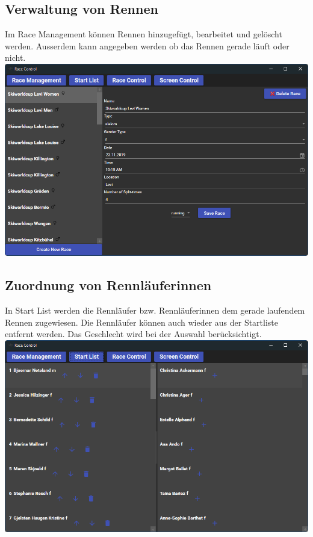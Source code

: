 \documentclass[a4paper, 12pt]{article}
\begin{document}
	\subsection{Verwaltung von Rennen}
	Im Race Management können Rennen hinzugefügt, bearbeitet und gelöscht werden. Ausserdem kann angegeben werden ob das Rennen gerade läuft oder nicht.
	\newline
	\includegraphics[width=.7\textwidth]{img/ui_raceManagement.png}
	\newline
	
	\subsection{Zuordnung von Rennläuferinnen}
	In Start List werden die Rennläufer bzw. Rennläuferinnen dem gerade laufendem Rennen zugewiesen.  Die Rennläufer können auch wieder aus der Startliste entfernt werden. Das Geschlecht wird bei der Auswahl berücksichtigt.
	\newline
	\includegraphics[width=.7\textwidth]{img/ui_startList.png}
	\newline
	
\end{document}
